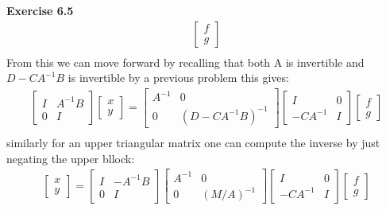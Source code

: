\documentclass[12pt]{article}
\newenvironment{exercise}[1]{\vspace{.1in}\noindent\textbf{Exercise #1 \hspace{.05em}}}{}
\theoremstyle{definition}
\theoremstyle{remark}
\begin{document}
\begin{exercise}{6.5}
\begin{align}
		\begin{bmatrix}
			f \\
			g
		\end{bmatrix} \\
	\end{align}
	From this we can move forward by recalling that both A is invertible and $D-CA^{-1}B$ is invertible by a previous problem this gives:
	\begin{align}
		\begin{bmatrix}
			I & A^{-1}B \\
			0 & I
		\end{bmatrix}
		\begin{bmatrix}
			x \\
			y
		\end{bmatrix}=%
		\begin{bmatrix}
			A^{-1} & 0                 \\
			0      & (D-CA^{-1}B)^{-1}
		\end{bmatrix}%
		\begin{bmatrix}
			I        & 0 \\
			-CA^{-1} & I
		\end{bmatrix}%
		\begin{bmatrix}
			f \\
			g
		\end{bmatrix} \\
	\end{align}
	similarly for an upper triangular matrix one can compute the inverse by just negating the upper bllock:
	\begin{align}
		\begin{bmatrix}
			x \\
			y
		\end{bmatrix}=%
		\begin{bmatrix}
			I & -A^{-1}B \\
			0 & I
		\end{bmatrix}
		\begin{bmatrix}
			A^{-1} & 0          \\
			0      & (M/A)^{-1}
		\end{bmatrix}%
		\begin{bmatrix}
			I        & 0 \\
			-CA^{-1} & I
		\end{bmatrix}%
		\begin{bmatrix}
			f \\
			g
		\end{bmatrix} \\
	\end{align}
\end{exercise}
\end{document}
